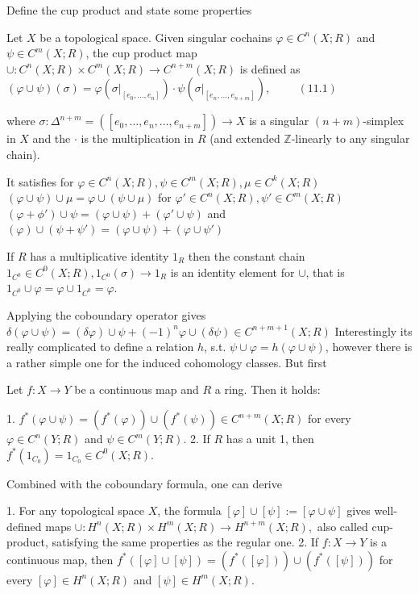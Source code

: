 Define the cup product and state some properties

Let \(X\) be a topological space. Given singular cochains \(\varphi \in C^n(X; R)\) and \(\psi \in C^m(X; R)\), 
the cup product map \( \cup : C^n(X;R) \times C^m(X;R) \to C^{n+m}(X;R) \) is defined as
\(
(\varphi \cup \psi)(\sigma) = \varphi(\sigma|_{[e_0, \dotsc, e_n]}) \cdot \psi(\sigma|_{[e_n, \dotsc, e_{n+m}]}), \hspace{1cm} (11.1)
\)

where \(\sigma : \Delta^{n+m} = ([e_0, \dotsc, e_n, \dotsc, e_{n+m}]) \to X\) is a singular \((n + m)\)-simplex in \(X\) and the \(\cdot\) is the multiplication in \(R\) 
(and extended \(\mathbb{Z}\)-linearly to any singular chain).

It satisfies for \( \varphi \in C^n(X;R), \psi \in C^m(X;R), \mu \in C^k(X;R) \)
\( (\varphi \cup \psi) \cup \mu = \varphi \cup (\psi \cup \mu) \)
for \( \varphi' \in C^n(X;R), \psi' \in C^m(X;R) \)
\( (\varphi + \phi') \cup \psi = (\varphi \cup \psi) + (\varphi' \cup \psi) \)
and 
\( (\varphi) \cup (\psi + \psi') = (\varphi \cup \psi) + (\varphi \cup \psi') \)

If \( R \) has a multiplicative identity \( 1_R \) then the constant chain \( 1_{C^0} \in C^0(X;R), 1_{C^0}(\sigma) \to 1_R \) 
is an identity element for \( \cup \), that is \( 1_{C^0} \cup \varphi = \varphi \cup 1_{C^0} = \varphi \).

Applying the coboundary operator gives
\( \delta(\varphi \cup \psi) = (\delta \varphi) \cup \psi + (-1)^n \varphi \cup (\delta \psi) \in C^{n+m+1}(X;R) \)
Interestingly its really complicated to define a relation \( h \), s.t. 
\( \psi \cup \varphi = h(\varphi \cup \psi) \), 
however there is a rather simple one for the induced cohomology classes. But first

Let \(f : X \to Y\) be a continuous map and \(R\) a ring. Then it holds:

1. \(f^* (\varphi \cup \psi) = (f^*(\varphi)) \cup (f^*(\psi)) \in C^{n+m}(X; R)\) for every \(\varphi \in C^n(Y; R)\) and \(\psi \in C^m(Y; R)\).
2. If \(R\) has a unit 1, then \(f^*(1_{C_0}) = 1_{C_0} \in C^0(X; R)\).

Combined with the coboundary formula, one can derive

1. For any topological space \(X\), the formula \([\varphi] \cup [\psi] := [\varphi \cup \psi]\) gives well-defined maps 
\(\cup : H^n(X; R) \times H^m(X; R) \to H^{n+m}(X; R),\)
also called cup-product, satisfying the same properties as the regular one.
2. If \(f : X \to Y\) is a continuous map, then \(f^*([\varphi] \cup [\psi]) = (f^*([\varphi])) \cup (f^*([\psi]))\) for every \([\varphi] \in H^n(X; R)\) and \([\psi] \in H^m(X; R)\).

